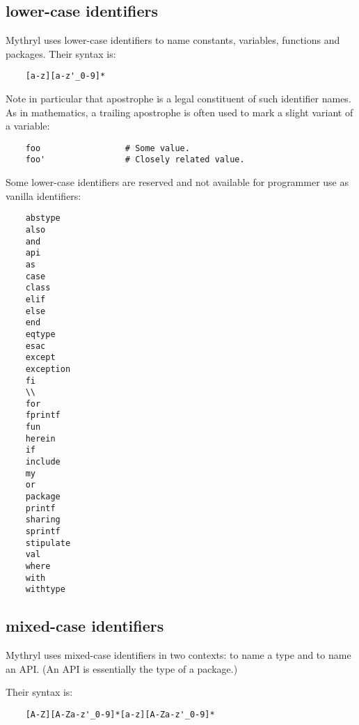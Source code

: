\cutend*


\subsection{lower-case identifiers}
\label{section:ref:identifiers:lower-case}

Mythryl uses lower-case identifiers to name constants,
variables, functions and packages.  Their syntax is:

\begin{verbatim}
    [a-z][a-z'_0-9]*
\end{verbatim}

Note in particular that apostrophe is a legal constituent 
of such identifier names.  As in mathematics, a trailing 
apostrophe is often used to mark a slight variant of a 
variable:

\begin{verbatim}
    foo                 # Some value.
    foo'                # Closely related value.
\end{verbatim}

Some lower-case identifiers are reserved and not 
available for programmer use as vanilla identifiers:

\begin{verbatim}
    abstype
    also
    and
    api
    as
    case
    class
    elif
    else
    end
    eqtype
    esac
    except
    exception
    fi
    \\
    for
    fprintf
    fun
    herein
    if
    include
    my
    or
    package
    printf
    sharing
    sprintf
    stipulate
    val
    where
    with
    withtype
\end{verbatim}


\cutend*

\subsection{mixed-case identifiers}
\label{section:ref:identifiers:mixed-case}

Mythryl uses mixed-case identifiers in two 
contexts: to name a type and to name an API. 
(An API is essentially the type of a package.)

Their syntax is:

\begin{verbatim}
    [A-Z][A-Za-z'_0-9]*[a-z][A-Za-z'_0-9]*
\end{verbatim}

